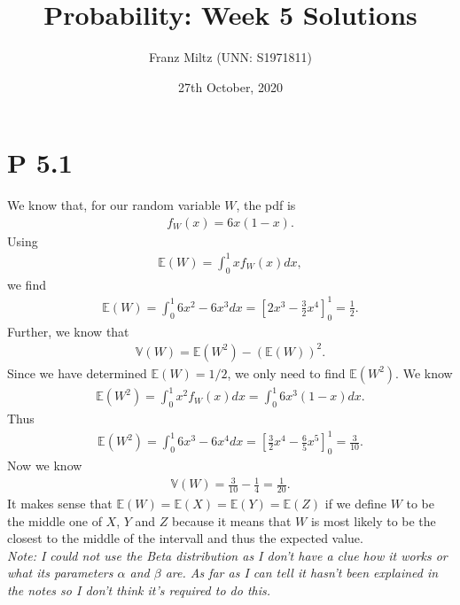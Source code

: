 \documentclass{article}
\newcommand{\E}{\mathbb{E}}
\newcommand{\V}{\mathbb{V}}
\begin{document}
\title{Probability: Week 5 Solutions}
\author{Franz Miltz (UNN: S1971811)}
\date{27th October, 2020}
\maketitle
\section*{P 5.1}
We know that, for our random variable $W$, the pdf is
\begin{align*}
  f_W(x) = 6x(1-x).
\end{align*}
Using
\begin{align*}
  \E(W) = \int_0^1 xf_W(x) dx,
\end{align*}
we find
\begin{align*}
  \E(W)=\int_0^1 6x^2-6x^3 dx = \left[2x^3 - \frac{3}{2}x^4\right]^1_0 = \frac{1}{2}.
\end{align*}
Further, we know that
\begin{align*}
  \V(W) = \E(W^2) - (\E(W))^2.
\end{align*}
Since we have determined $\E(W)=1/2$, we only need to find $\E(W^2)$. We know
\begin{align*}
  \E(W^2) = \int_0^1 x^2 f_{W}(x)dx = \int_0^1 6x^3(1-x)dx.
\end{align*}
Thus
\begin{align*}
  \E(W^2) = \int_0^1 6x^3-6x^4 dx = \left[\frac{3}{2} x^4 - \frac{6}{5}x^5\right]_0^1=\frac{3}{10}.
\end{align*}
Now we know
\begin{align*}
  \V(W) = \frac{3}{10}-\frac{1}{4} = \frac{1}{20}.
\end{align*}
It makes sense that $\E(W) = \E(X) = \E(Y) = \E(Z)$ if we define $W$ to be the middle one of $X$, $Y$ and $Z$ because
it means that $W$ is most likely to be the closest to the middle of the intervall and thus the expected value.\\

\emph{Note: I could not use the Beta distribution as I don't have
a clue how it works or what its parameters $\alpha$ and $\beta$ are.
As far as I can tell it hasn't been explained in the notes so I don't
think it's required to do this.}
\end{document}

